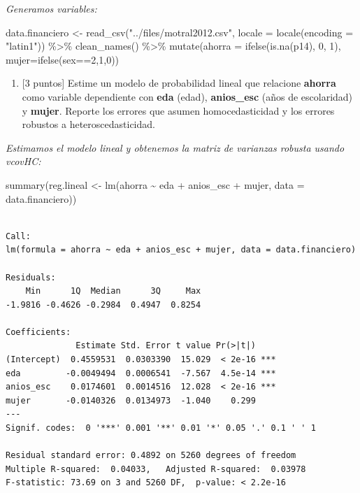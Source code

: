 \documentclass[
  letterpaper,
  DIV=11,
  numbers=noendperiod]{scrartcl}
\newenvironment{Shaded}{\begin{snugshade}}{\end{snugshade}}
\newcommand{\AttributeTok}[1]{\textcolor[rgb]{0.40,0.45,0.13}{#1}}
\newcommand{\DecValTok}[1]{\textcolor[rgb]{0.68,0.00,0.00}{#1}}
\newcommand{\FunctionTok}[1]{\textcolor[rgb]{0.28,0.35,0.67}{#1}}
\newcommand{\NormalTok}[1]{\textcolor[rgb]{0.00,0.23,0.31}{#1}}
\newcommand{\OtherTok}[1]{\textcolor[rgb]{0.00,0.23,0.31}{#1}}
\newcommand{\SpecialCharTok}[1]{\textcolor[rgb]{0.37,0.37,0.37}{#1}}
\newcommand{\StringTok}[1]{\textcolor[rgb]{0.13,0.47,0.30}{#1}}
\providecommand{\tightlist}{%
  \setlength{\itemsep}{0pt}\setlength{\parskip}{0pt}}\usepackage{longtable,booktabs,array}
\begin{document}
\emph{Generamos variables:}

\begin{Shaded}
\begin{Highlighting}[]
\NormalTok{data.financiero }\OtherTok{\textless{}{-}} \FunctionTok{read\_csv}\NormalTok{(}\StringTok{"../files/motral2012.csv"}\NormalTok{,}
                          \AttributeTok{locale =} \FunctionTok{locale}\NormalTok{(}\AttributeTok{encoding =} \StringTok{"latin1"}\NormalTok{)) }\SpecialCharTok{\%\textgreater{}\%}
  \FunctionTok{clean\_names}\NormalTok{() }\SpecialCharTok{\%\textgreater{}\%} 
  \FunctionTok{mutate}\NormalTok{(}\AttributeTok{ahorra =} \FunctionTok{ifelse}\NormalTok{(}\FunctionTok{is.na}\NormalTok{(p14), }\DecValTok{0}\NormalTok{, }\DecValTok{1}\NormalTok{),}
         \AttributeTok{mujer=}\FunctionTok{ifelse}\NormalTok{(sex}\SpecialCharTok{==}\DecValTok{2}\NormalTok{,}\DecValTok{1}\NormalTok{,}\DecValTok{0}\NormalTok{))}
\end{Highlighting}
\end{Shaded}

\begin{enumerate}
\def\labelenumi{\alph{enumi}.}
\tightlist
\item
  {[}3 puntos{]} Estime un modelo de probabilidad lineal que relacione
  \textbf{ahorra} como variable dependiente con \textbf{eda} (edad),
  \textbf{anios\_esc} (años de escolaridad) y \textbf{mujer}. Reporte
  los errores que asumen homocedasticidad y los errores robustos a
  heteroscedasticidad.
\end{enumerate}

\emph{Estimamos el modelo lineal y obtenemos la matriz de varianzas
robusta usando vcovHC:}

\begin{Shaded}
\begin{Highlighting}[]
\FunctionTok{summary}\NormalTok{(reg.lineal }\OtherTok{\textless{}{-}} \FunctionTok{lm}\NormalTok{(ahorra }\SpecialCharTok{\textasciitilde{}}\NormalTok{ eda }\SpecialCharTok{+}\NormalTok{ anios\_esc }\SpecialCharTok{+}\NormalTok{ mujer,}
                         \AttributeTok{data =}\NormalTok{ data.financiero))}
\end{Highlighting}
\end{Shaded}

\begin{verbatim}

Call:
lm(formula = ahorra ~ eda + anios_esc + mujer, data = data.financiero)

Residuals:
    Min      1Q  Median      3Q     Max 
-1.9816 -0.4626 -0.2984  0.4947  0.8254 

Coefficients:
              Estimate Std. Error t value Pr(>|t|)    
(Intercept)  0.4559531  0.0303390  15.029  < 2e-16 ***
eda         -0.0049494  0.0006541  -7.567  4.5e-14 ***
anios_esc    0.0174601  0.0014516  12.028  < 2e-16 ***
mujer       -0.0140326  0.0134973  -1.040    0.299    
---
Signif. codes:  0 '***' 0.001 '**' 0.01 '*' 0.05 '.' 0.1 ' ' 1

Residual standard error: 0.4892 on 5260 degrees of freedom
Multiple R-squared:  0.04033,   Adjusted R-squared:  0.03978 
F-statistic: 73.69 on 3 and 5260 DF,  p-value: < 2.2e-16
\end{verbatim}
\end{document}
